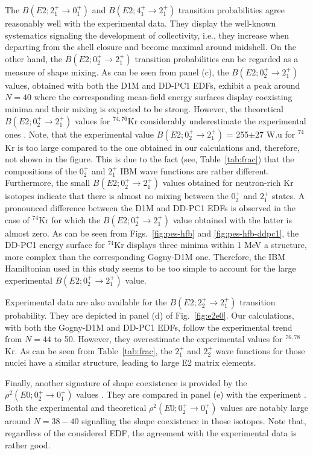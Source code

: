 \documentclass[twocolumn,showpacs,amsmath,amssymb,superscriptaddress]{revtex4-1}
\begin{document}
 
The  $B(E2; 2^+_1\rightarrow 0^+_1)$ and $B(E2;4^+_1\rightarrow 2^+_1)$ transition 
probabilities agree reasonably well with the experimental data. They display the
well-known systematics signaling the development of collectivity, i.e.,  they
increase  when departing from the shell closure and become maximal around midshell.
On the other hand, the $B(E2; 0^+_2\rightarrow 2^+_1)$ transition
probabilities can be regarded as a measure of shape mixing. As can be seen from 
panel (c), the $B(E2; 0^+_2\rightarrow 2^+_1)$ values, obtained with both 
the  D1M and DD-PC1 EDFs, exhibit a peak around $N=40$ where the corresponding
mean-field energy surfaces display coexisting minima and their 
mixing is expected to be
strong. However, the theoretical $B(E2; 0^+_2\rightarrow 2^+_1)$ values for
$^{74,76}$Kr considerably underestimate the experimental
ones \cite{clement2007}.  Note, that the experimental value
$B(E2; 0^+_2\rightarrow 2^+_1)$ = 255$\pm 27$ W.u \cite{clement2007}  for
$^{74}$Kr  is too
large compared to the one obtained in our calculations and, therefore,
not shown in the figure. 
This is due to the fact (see, Table~\ref{tab:frac}) that  the
compositions of the $0^+_2$ and $2^+_1$
IBM wave functions are rather different. Furthermore, the small
$B(E2; 0^+_2\rightarrow 2^+_1)$
values obtained for neutron-rich Kr isotopes indicate 
that
there is almost no mixing between the $0^+_2$ and $2^+_1$ states.
A pronounced  difference between the D1M and DD-PC1 EDFs is observed 
in the case of $^{74}$Kr
for which
 the $B(E2; 0^+_2\rightarrow 2^+_1)$ value obtained with  the latter
is almost zero. As can be seen from Figs.~\ref{fig:pes-hfb} and 
\ref{fig:pes-hfb-ddpc1}, the
DD-PC1 energy surface for $^{74}$Kr  displays three minima within 1 MeV 
a structure, more complex than the corresponding Gogny-D1M one. Therefore, the
IBM Hamiltonian
used  in this study seems to be too simple to account for the large 
experimental
$B(E2; 0^+_2\rightarrow 2^+_1)$ value. 


Experimental data are also  available for the 
$B(E2;2^+_2\rightarrow 2^+_1)$ transition probability.
They are depicted in panel (d) of Fig.~\ref{fig:e2e0}.
Our calculations, with both the Gogny-D1M 
and DD-PC1 EDFs, follow the
experimental trend from $N=44$ to 50. However, they 
overestimate the experimental
values for  $^{76,78}$Kr. As can be seen from Table~\ref{tab:frac}, the $2^+_1$ and $2^+_2$ wave
functions for those nuclei have a similar structure, leading to 
large E2 matrix elements.  

Finally, another signature of shape coexistence is provided 
by the $\rho^2(E0; 0^+_2\rightarrow 0^+_1)$ values \cite{heyde2011}. They
are compared in panel (e) with the experiment \cite{kibedi2005}.
Both the experimental and theoretical $\rho^2(E0; 0^+_2\rightarrow
0^+_1)$ values are notably large around $N=38-40$ 
signalling the shape coexistence in those isotopes. Note that, regardless
of the considered EDF, the agreement with the experimental data is rather
good.
\end{document}
